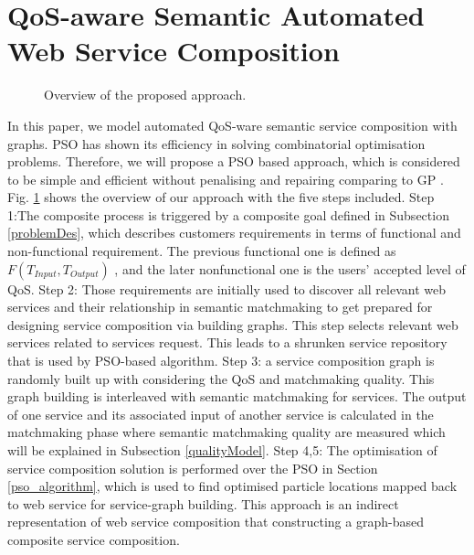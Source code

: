 \documentclass{llncs}
\begin{document}
\section{QoS-aware Semantic Automated Web Service Composition}\label{qswsc_approach}
\begin{figure}[h]
\centerline{
}
 \caption{Overview of the proposed approach.}
 \label{overview}
\end{figure}
In this paper, we model automated QoS-ware semantic service composition with graphs. PSO has shown its efficiency in solving combinatorial optimisation problems. Therefore, we will propose a PSO based approach, which is considered to be simple and efficient without penalising and repairing comparing to GP \cite{da2014graph}. Fig. \ref{overview} shows the overview of our approach with the five steps included. Step 1:The composite process is triggered by a composite goal defined in Subsection \ref{problemDes}, which describes customers requirements in terms of functional and non-functional requirement. The previous functional one is defined as $F(T_{Input}, T_{Output})$ , and the later nonfunctional one is the users' accepted level of QoS. Step 2: Those requirements are initially used to discover all relevant web services and their relationship in semantic matchmaking to get prepared for designing service composition via building graphs. This step selects relevant web services related to services request. This leads to a shrunken service repository that is used by PSO-based algorithm. Step 3: a service composition graph is randomly built up with considering the QoS and matchmaking quality. This graph building is interleaved with semantic matchmaking for services. The output of one service and its associated input of another service is calculated in the matchmaking phase where semantic matchmaking quality are measured which will be explained in Subsection \ref{qualityModel}. Step 4,5: The optimisation of service composition solution is performed over the PSO in Section \ref{pso_algorithm}, which is used to find optimised particle locations mapped back to web service for service-graph building. This approach \cite{da2016particle} is an indirect representation of web service composition that constructing a graph-based composite service composition.
\end{document}
